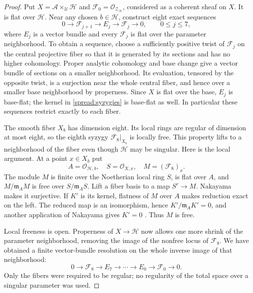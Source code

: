 \documentclass[11pt]{article}
\theoremstyle{definition}
\theoremstyle{remark}
\numberwithin{equation}{section}
\begin{document}
\begin{proof}
Put $X=\mathscr A\times_{\mathcal U}\mathcal H$ and
$\mathcal F_0=\mathcal O_{\mathscr Z_{\mathcal H}}$, considered as a
coherent sheaf on $X$.  It is flat over $\mathcal H$.  Near any chosen
$b\in\mathcal H$, construct eight exact sequences
\begin{equation}
 0\longrightarrow\mathcal F_{j+1}\longrightarrow E_j
   \longrightarrow\mathcal F_j\longrightarrow0,
 \qquad 0\le j\le7,
 \label{spread:syzygies}
\end{equation}
where $E_j$ is a vector bundle and every $\mathcal F_j$ is flat over
the parameter neighborhood.  To obtain a sequence, choose a sufficiently
positive twist of $\mathcal F_j$ on the central projective fiber so that
it is generated by its sections and has no higher cohomology.  Proper
analytic cohomology and base change give a vector bundle of sections
on a smaller neighborhood.  Its evaluation, tensored by the opposite
twist, is a surjection near the whole central fiber, and hence over
a smaller base neighborhood by properness.  Since $X$ is flat over
the base, $E_j$ is base-flat; the kernel in \eqref{spread:syzygies}
is base-flat as well.  In particular these sequences restrict exactly
to each fiber.

The smooth fiber $X_b$ has dimension eight.  Its local rings are regular
of dimension at most eight, so the eighth syzygy
$\mathcal F_8|_{X_b}$ is locally free.  This property lifts to a
neighborhood of the fiber even though $\mathcal H$ may be singular.
Here is the local argument.  At a point $x\in X_b$ put
\[
 A=\mathcal O_{\mathcal H,b},\quad
 S=\mathcal O_{X,x},\quad M=(\mathcal F_8)_x.
\]
The module $M$ is finite over the Noetherian local ring $S$, is flat
over $A$, and $M/\mathfrak m_A M$ is free over
$S/\mathfrak m_A S$.  Lift a fiber basis to a map $S^r\to M$.
Nakayama makes it surjective.  If $K'$ is its kernel, flatness of $M$
over $A$ makes reduction exact on the left.  The reduced map is an
isomorphism, hence $K'/\mathfrak m_A K'=0$, and another application
of Nakayama gives $K'=0$ \cite{stacks-flat-free}.  Thus $M$ is free.

Local freeness is open.  Properness of $X\to\mathcal H$ now allows one
more shrink of the parameter neighborhood, removing the image of the
nonfree locus of $\mathcal F_8$.  We have obtained a finite vector-bundle
resolution on the whole inverse image of that neighborhood:
\begin{equation}
 0\longrightarrow\mathcal F_8\longrightarrow E_7\longrightarrow
 \cdots\longrightarrow E_0\longrightarrow\mathcal F_0
 \longrightarrow0.
 \label{spread:relative-resolution}
\end{equation}
Only the fibers were required to be regular; no regularity of the total
space over a singular parameter was used.


\end{proof}
\end{document}
